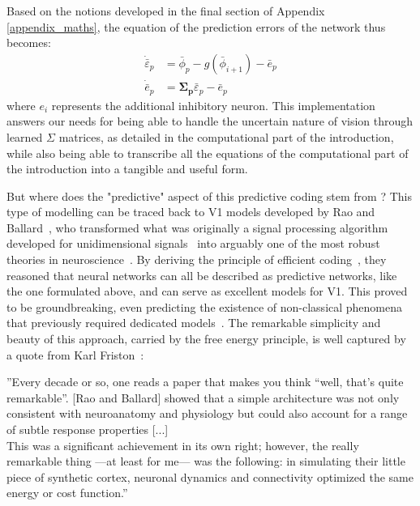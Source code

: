 Based on the notions developed in the final section of Appendix \ref{appendix_maths}, the equation of the prediction errors of the network thus becomes:
\begin{equation}
    \begin{aligned}
\dot{\bar{\varepsilon}}_p &= \bar{\phi}_p - g(\bar{\phi}_{i+1}) - \bar{e}_p  \\
\dot{\bar{e}}_p &= \mathbf{\Sigma_p} \bar{\varepsilon}_p - \bar{e}_p 
    \end{aligned}
\end{equation}
where $e_i$ represents the additional inhibitory neuron. This implementation answers our needs for being able to handle the uncertain nature of vision through learned $\Sigma$ matrices, as detailed in the computational part of the introduction, while also being able to transcribe all the equations of the computational part of the introduction into a tangible and useful form.

But where does the "predictive" aspect of this predictive coding stem from ? This type of modelling can be traced back to \gls{V1} models developed by Rao and Ballard~\cite{rao1999predictive}, who transformed what was originally a signal processing algorithm developed for unidimensional signals~\cite{makhoul1975linear} into arguably one of the most robust theories in neuroscience~\cite{friston2009predictive}. By deriving the principle of efficient coding~\cite{barlow2001redundancy}, they reasoned that neural networks can all be described as predictive networks, like the one formulated above, and can serve as excellent models for \gls{V1}. This proved to be groundbreaking, even predicting the existence of non-classical phenomena~\cite{rao1999predictive} that previously required dedicated models~\cite{skottun1998model}. The remarkable simplicity and beauty of this approach, carried by the free energy principle, is well captured by a quote from Karl Friston~\cite{friston2018does}:
\begin{displayquote}
''Every decade or so, one reads a paper that makes you think “well, that’s quite remarkable”. [Rao and Ballard] showed that a simple architecture was not only consistent with neuroanatomy and physiology but could also account for a range of subtle response properties [...] \\
This was a significant achievement in its own right; however, the really remarkable thing —at least for me— was the following: in simulating their little piece of synthetic cortex, neuronal dynamics and connectivity optimized the same energy or cost function.''
\end{displayquote}

